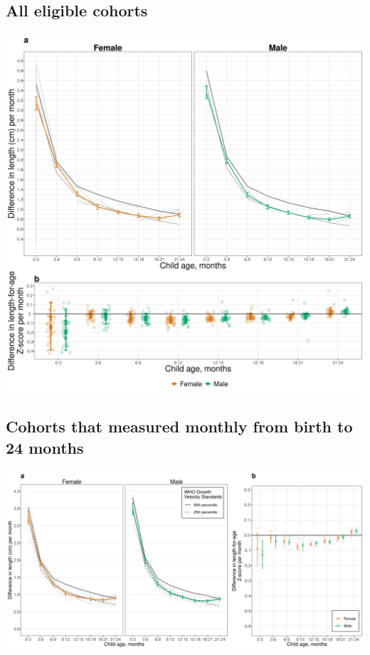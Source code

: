 \documentclass[
  9pt,
]{book}
\begin{document}
\hypertarget{all-eligible-cohorts-3}{%
\subsection{All eligible cohorts}\label{all-eligible-cohorts-3}}

\includegraphics[width=50in]{figures//stunting/fig-stunt-2-vel-overall--allage-primary}

\hypertarget{cohorts-that-measured-monthly-from-birth-to-24-months-3}{%
\subsection{Cohorts that measured monthly from birth to 24 months}\label{cohorts-that-measured-monthly-from-birth-to-24-months-3}}

\includegraphics[width=50in]{figures//stunting/fig-stunt-2-vel-overall--allage-month24}
\end{document}

